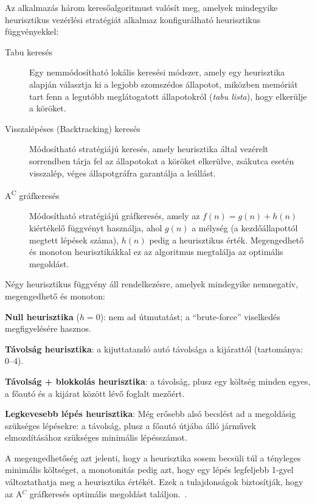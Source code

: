 Az alkalmazás három keresőalgoritmust valósít meg, amelyek mindegyike heurisztikus vezérlési stratégiát alkalmaz konfigurálható heurisztikus függvényekkel:

\begin{description}
    \item[Tabu keresés] Egy nemmódosítható lokális keresési módszer, amely egy heurisztika alapján választja ki a legjobb szomszédos állapotot, miközben memóriát tart fenn a legutóbb meglátogatott állapotokról (\emph{tabu lista}), hogy elkerülje a köröket.
    \item[Visszalépéses (Backtracking) keresés] Módosítható stratégiájú keresés, amely heurisztika által vezérelt sorrendben tárja fel az állapotokat a köröket elkerülve, zsákutca esetén visszalép, véges állapotgráfra garantálja a leállást.
    \item[A\textsuperscript{C} gráfkeresés] Módosítható stratégiájú gráfkeresés, amely az $f(n) = g(n) + h(n)$ kiértékelő függvényt használja, ahol $g(n)$ a mélység (a kezdőállapottól megtett lépések száma), $h(n)$ pedig a heurisztikus érték. Megengedhető és monoton heurisztikákkal ez az algoritmus megtalálja az optimális megoldást.
\end{description}

Négy heurisztikus függvény áll rendelkezésre, amelyek mindegyike nemnegatív, megengedhető és monoton:~\cite[14--15.~oldal]{gregorics_grafker}
\begin{compactitem}
    \item \textbf{Null heurisztika} ($h = 0$): nem ad útmutatást; a \enquote{brute-force} viselkedés megfigyelésére hasznos.
    \item \textbf{Távolság heurisztika}: a kijuttatandó autó távolsága a kijárattól (tartománya: 0--4).
    \item \textbf{Távolság + blokkolás heurisztika}: a távolság, plusz egy költség minden egyes, a főautó és a kijárat között lévő foglalt mezőért.
    \item \textbf{Legkevesebb lépés heurisztika}: Még erősebb alsó becslést ad a megoldásig szükséges lépésekre: a távolság, plusz a főautó útjába álló járművek elmozdításához szükséges minimális lépésszámot.
\end{compactitem}

A megengedhetőség azt jelenti, hogy a heurisztika sosem becsüli túl a tényleges minimális költséget, a monotonitás pedig azt, hogy egy lépés legfeljebb 1-gyel változtathatja meg a heurisztika értékét. Ezek a tulajdonságok biztosítják, hogy az A$^C$ gráfkeresés optimális megoldást találjon.~\cite[16.~oldal]{gregorics_grafker}.


